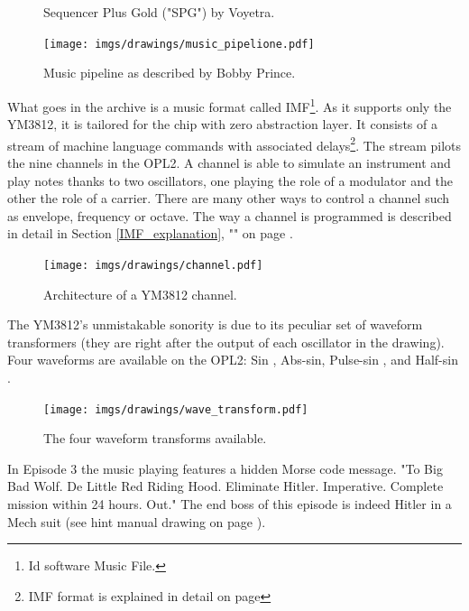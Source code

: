 \documentclass[book.tex]{subfiles}
\begin{document}
\begin{figure}[H]
\centering
\caption{Sequencer Plus Gold ("SPG") by Voyetra.}
\end{figure}

\begin{figure}[H]
\centering

 \texttt{[image: imgs/drawings/music\_pipelione.pdf]}
 \caption{Music pipeline as described by Bobby Prince.}
\end{figure}
What goes in the  archive is a music format called IMF\footnote{Id software Music File.}. As it supports only the YM3812, it is tailored for the chip with zero abstraction layer. It consists of a stream of machine language commands with associated delays\footnote{IMF format is explained in detail on page \pageref{IMF_explanation}}. The stream pilots the nine channels in the OPL2. A channel is able to simulate an instrument and play notes thanks to two oscillators, one playing the role of a modulator and the other the role of a carrier. There are many other ways to control a channel such as envelope, frequency or octave. The way a channel is programmed is described in detail in Section \ref{IMF_explanation}, "" on page \pageref{IMF_explanation}.
\begin{figure}[H]
\centering
 \texttt{[image: imgs/drawings/channel.pdf]}
 \caption{Architecture of a YM3812 channel.}
\end{figure}
\par
{}  The YM3812's unmistakable sonority is due to its peculiar set of waveform transformers (they are right after the output of each oscillator in the drawing). Four waveforms are available on the OPL2: Sin , Abs-sin, Pulse-sin , and Half-sin .
\par
\begin{figure}[H]
\centering
 \texttt{[image: imgs/drawings/wave\_transform.pdf]}
 \caption{The four waveform transforms available.}
\end{figure}


 In Episode 3 the music playing features a hidden Morse code message. "To Big Bad Wolf. De Little Red Riding Hood. Eliminate Hitler. Imperative. Complete mission within 24 hours. Out." The end boss of this episode is indeed Hitler in a Mech suit (see hint manual drawing on page \pageref{hitler_drawing}).
\end{document}
